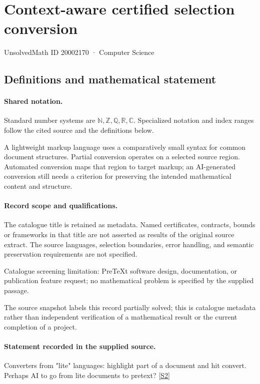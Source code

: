 \documentclass[11pt]{article}
\newcommand{\sref}[2]{\hyperlink{source:#1:#2}{[S#2]}}
\begin{document}
\setcounter{section}{20002169}
\section{Context-aware certified selection conversion}\label{20002170}
{\small\sffamily UnsolvedMath ID 20002170 · Computer Science}
\subsection{Definitions and mathematical statement}

\paragraph{Shared notation.}Standard number systems are $\mathbb N,\mathbb Z,\mathbb Q,\mathbb R,\mathbb C$. Specialized notation and index ranges follow the cited source and the definitions below.


A lightweight markup language uses a comparatively small syntax for common document structures. Partial conversion operates on a selected source region. Automated conversion maps that region to target markup; an AI-generated conversion still needs a criterion for preserving the intended mathematical content and structure.
\paragraph{Record scope and qualifications.}
The catalogue title is retained as metadata. Named certificates, contracts, bounds or frameworks in that title are not asserted as results of the original source extract.
The source languages, selection boundaries, error handling, and semantic preservation requirements are not specified.

Catalogue screening limitation: PreTeXt software design, documentation, or publication feature request; no mathematical problem is specified by the supplied passage.

The source snapshot labels this record partially solved; this is catalogue metadata rather than independent verification of a mathematical result or the current completion of a project.
\paragraph{Statement recorded in the supplied source.}
Converters from "lite" languages: highlight part of a document and hit convert. Perhaps AI to go from lite documents to pretext? \sref{20002170}{2}
\end{document}
